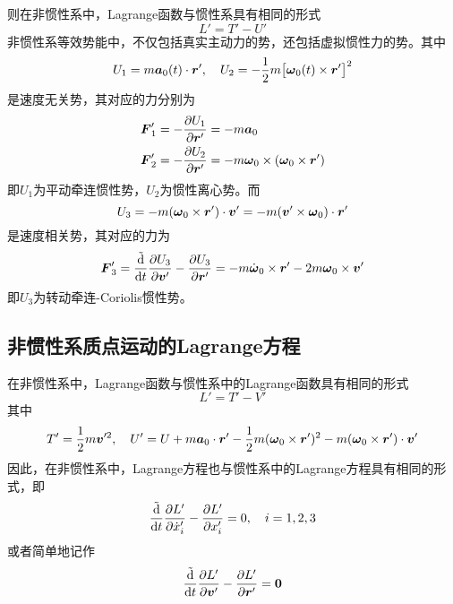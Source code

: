 则在非惯性系中，Lagrange函数与惯性系具有相同的形式
\begin{equation*}
	L' = T' - U'
\end{equation*}
非惯性系等效势能中，不仅包括真实主动力的势，还包括虚拟惯性力的势。其中
\begin{equation*}
	U_1 = m\boldsymbol{a}_0(t) \cdot \boldsymbol{r}',\quad U_2 = -\frac12 m\big[\boldsymbol{\omega}_0(t) \times \boldsymbol{r}'\big]^2
\end{equation*}
是速度无关势，其对应的力分别为
\begin{align*}
	\boldsymbol{F}'_1 & = -\frac{\partial U_1}{\partial \boldsymbol{r}'} = -m\boldsymbol{a}_0 \\
	\boldsymbol{F}'_2 & = -\frac{\partial U_2}{\partial \boldsymbol{r}'} = -m\boldsymbol{\omega}_0 \times (\boldsymbol{\omega}_0 \times \boldsymbol{r}')
\end{align*}
即$U_1$为{\heiti 平动牵连惯性势}，$U_2$为{\heiti 惯性离心势}。而
\begin{equation*}
	U_3 = -m(\boldsymbol{\omega}_0 \times \boldsymbol{r}') \cdot \boldsymbol{v}' = -m(\boldsymbol{v}' \times \boldsymbol{\omega}_0) \cdot \boldsymbol{r}'
\end{equation*}
是速度相关势，其对应的力为
\begin{equation*}
	\boldsymbol{F}'_3 = \frac{\tilde{\mathrm{d}}}{\mathrm{d} t} \frac{\partial U_3}{\partial \boldsymbol{v}'} - \frac{\partial U_3}{\partial \boldsymbol{r}'} = -m\dot{\boldsymbol{\omega}}_0 \times \boldsymbol{r}' - 2m\boldsymbol{\omega}_0 \times \boldsymbol{v}'
\end{equation*}
即$U_3$为{\heiti 转动牵连-Coriolis惯性势}。

\subsection{非惯性系质点运动的Lagrange方程}

在非惯性系中，Lagrange函数与惯性系中的Lagrange函数具有相同的形式
\begin{equation*}
	L' = T'-V'
\end{equation*}
其中
\begin{equation*}
	T' = \frac12 m\boldsymbol{v}'^2,\quad U' = U+m\boldsymbol{a}_0 \cdot \boldsymbol{r}' - \frac12 m (\boldsymbol{\omega}_0 \times \boldsymbol{r}')^2 - m(\boldsymbol{\omega}_0 \times \boldsymbol{r}') \cdot \boldsymbol{v}'
\end{equation*}
因此，在非惯性系中，Lagrange方程也与惯性系中的Lagrange方程具有相同的形式，即
\begin{equation}
	\frac{\tilde{\mathrm{d}}}{\mathrm{d} t} \frac{\partial L'}{\partial \dot{x}'_i} - \frac{\partial L'}{\partial x'_i} = 0,\quad i=1,2,3
\end{equation}
或者简单地记作
\begin{equation}
	\frac{\tilde{\mathrm{d}}}{\mathrm{d} t} \frac{\partial L'}{\partial \boldsymbol{v}'} - \frac{\partial L'}{\partial \boldsymbol{r}'} = \boldsymbol{0}
\end{equation}

